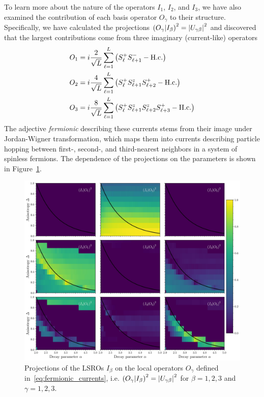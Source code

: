 To learn more about the nature of the operators \(I_1\), \(I_2\), and \(I_3\), we have also
examined the contribution of each basis operator \(O_{\gamma}\) to their structure. Specifically,
we have calculated the projections \(\left(O_{\gamma} \middle| I_{\beta}\right)^2 = \abs{U_{\gamma\beta}}^2\)
and discovered that the largest contributions come from three imaginary (current-like) operators
\begin{align}
  O_1 & = i \frac{2}{\sqrt{L}} \sum_{\ell=1}^L \left(S^{+}_{\ell} S^{-}_{\ell+1} - \textrm{H.c.}\right)\nonumber                  \\
  O_2 & = i \frac{4}{\sqrt{L}} \sum_{\ell=1}^L \left(S^{+}_{\ell} S^{z}_{\ell+1} S^{+}_{\ell+2} - \textrm{H.c.}\right)\nonumber     \\
  O_3 & = i \frac{8}{\sqrt{L}} \sum_{\ell=1}^L \left(S^{+}_{\ell} S^{z}_{\ell+1} S^{z}_{\ell+2} S^{+}_{\ell+3} - \textrm{H.c.}\right)
  \label{eq:fermionic_currents}
\end{align}
The adjective \textit{fermionic} describing these currents stems from their image under Jordan-Wigner transformation,
which maps them into currents describing particle hopping between first-, second-, and third-nearest neighbors in a system
of spinless fermions.
The dependence of the projections on the parameters is shown in Figure~\ref{fig:projections}.

\begin{figure}[htbp]
  \centering
  \includegraphics[width=\linewidth]{Figures/projections.jpg}
  \caption{Projections of the LSROs \(I_{\beta}\) on the local operators \(O_{\gamma}\) defined in~\eqref{eq:fermionic_currents},
    i.e. \(\left(O_{\gamma} \middle| I_{\beta}\right)^2 = \abs{U_{\gamma\beta}}^2\) for \(\beta = 1,2,3\) and \(\gamma = 1,2,3\).}
  \label{fig:projections}
\end{figure}

